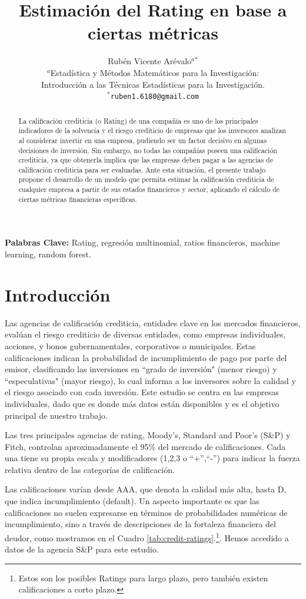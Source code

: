 \documentclass{article}
\title{Estimación del Rating en base a ciertas métricas}
\author{Rubén Vicente Arévalo$^{a}$$^{*}$ \\
         $^{a}$Estadística y Métodos Matemáticos para la Investigación:\\ Introducción a las Técnicas Estadísticas para la Investigación.\\
        \small $^{*}$\tt{ruben1.6180@gmail.com} \\
}
\date{}
\begin{document}
\maketitle
\begin{abstract} 
\noindent 
La calificación crediticia (o Rating) de una compañía es uno de los principales indicadores de la solvencia y el riesgo crediticio de empresas que los inversores analizan al considerar invertir en una empresa, pudiendo ser un factor decisivo en algunas decisiones de inversión. Sin embargo, no todas las compañías poseen una calificación crediticia, ya que obtenerla implica que las empresas deben pagar a las agencias de calificación crediticia para ser evaluadas. Ante esta situación, el presente trabajo propone el desarrollo de un modelo que permita estimar la calificación crediticia de cualquier empresa a partir de sus estados financieros y sector, aplicando el cálculo de ciertas métricas financieras específicas. 

\end{abstract}
 
\noindent\textbf{Palabras Clave:} Rating, regresión multinomial, ratios financieros, machine learning, random forest.\\

\section{Introducción}
Las agencias de calificación crediticia, entidades clave en los mercados financieros, evalúan el riesgo crediticio de diversas entidades, como empresas individuales, acciones, y bonos gubernamentales, corporativos o municipales. Estas calificaciones indican la probabilidad de incumplimiento de pago por parte del emisor, clasificando las inversiones en ``grado de inversión" (menor riesgo) y ``especulativas" (mayor riesgo), lo cual informa a los inversores sobre la calidad y el riesgo asociado con cada inversión. Este estudio se centra en las empresas individuales, dado que es donde más datos están disponibles y es el objetivo principal de nuestro trabajo.

Las tres principales agencias de rating, Moody's, Standard and Poor's (S\&P) y Fitch, controlan aproximadamente el 95\% del mercado de calificaciones. Cada una tiene su propia escala y modificadores (1,2,3 o ``+'',``-'') para indicar la fuerza relativa dentro de las categorías de calificación.

Las calificaciones varían desde AAA, que denota la calidad más alta, hasta D, que indica incumplimiento (default). Un aspecto importante es que las calificaciones no suelen expresarse en términos de probabilidades numéricas de incumplimiento, sino a través de descripciones de la fortaleza financiera del deudor, como mostramos en el Cuadro \ref{tab:credit-ratings}.\footnote{Estos son los posibles Ratings para largo plazo, pero también existen calificaciones a corto plazo.}. Hemos accedido  a datos de la agencia S\&P para este estudio.
\end{document}
